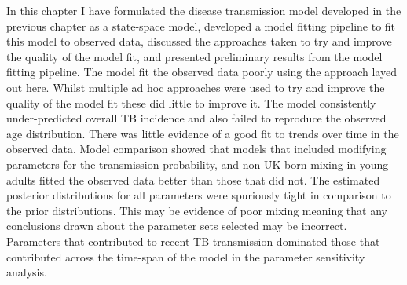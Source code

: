 \documentclass[11pt,twoside]{bristolthesis}
\begin{document}
  In this chapter I have formulated the disease transmission model developed in the previous chapter as a state-space model, developed a model fitting pipeline to fit this model to observed data, discussed the approaches taken to try and improve the quality of the model fit, and presented preliminary results from the model fitting pipeline. The model fit the observed data poorly using the approach layed out here. Whilst multiple ad hoc approaches were used to try and improve the quality of the model fit these did little to improve it. The model consistently under-predicted overall TB incidence and also failed to reproduce the observed age distribution. There was little evidence of a good fit to trends over time in the observed data. Model comparison showed that models that included modifying parameters for the transmission probability, and non-UK born mixing in young adults fitted the observed data better than those that did not. The estimated posterior distributions for all parameters were spuriously tight in comparison to the prior distributions. This may be evidence of poor mixing meaning that any conclusions drawn about the parameter sets selected may be incorrect. Parameters that contributed to recent TB transmission dominated those that contributed across the time-span of the model in the parameter sensitivity analysis.
  
\end{document}
